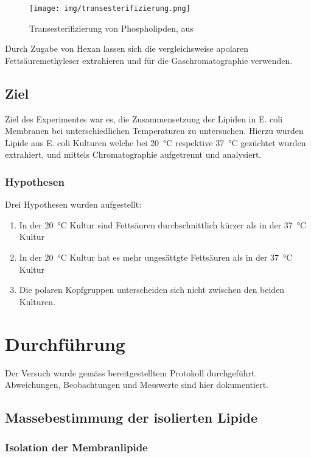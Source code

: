 \documentclass[a4paper,english]{scrreprt}
\begin{document}
\begin{figure}
	\centering
	\texttt{[image: img/transesterifizierung.png]}
	\caption{Transesterifizierung von Phospholipden, aus \cite{handoutv11}}
	\label{fig:transesterifizierung}
\end{figure}

Durch Zugabe von Hexan lassen sich die vergleichsweise apolaren
Fettsäuremethyleser extrahieren und für die Gaschromatographie verwenden.

\section{Ziel}

Ziel des Experimentes war es, die Zusammensetzung der Lipiden in E. coli
Membranen bei unterschiedlichen Temperaturen zu untersuchen. Hierzu wurden
Lipide aus E. coli Kulturen welche bei \SI{20}{\celsius} respektive
\SI{37}{\celsius} gezüchtet wurden extrahiert, und mittels Chromatographie
aufgetrennt und analysiert.

\subsection{Hypothesen}

Drei Hypothesen wurden aufgestellt:
\begin{enumerate}
	\item In der \SI{20}{\celsius} Kultur sind Fettsäuren durchschnittlich
		kürzer als in der \SI{37}{\celsius} Kultur
	\item In der \SI{20}{\celsius} Kultur hat es mehr ungesättgte
		Fettsäuren als in der \SI{37}{\celsius} Kultur
	\item Die polaren Kopfgruppen unterscheiden sich nicht zwischen den
		beiden Kulturen.
\end{enumerate}

\chapter{Durchführung}

Der Versuch wurde gemäss bereitgestelltem Protokoll \cite{skriptv11}
durchgeführt. Abweichungen, Beobachtungen und Messwerte sind hier dokumentiert.

\section{Massebestimmung der isolierten Lipide}

\subsection{Isolation der Membranlipide}
\end{document}
